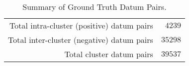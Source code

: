 \begin{table}[htp]
	\begin{center}
	\caption{Summary of Ground Truth Datum Pairs.}
	\label{tab:ch6_table_pair_summary}
		\begin{tabular}{r r}
		\toprule
			Total intra-cluster (positive) datum pairs & $4239$\\
			Total inter-cluster (negative) datum pairs & $35298$\\
			\midrule Total cluster datum pairs & $39537$\\
		\bottomrule
		\end{tabular}
	\end{center}
\end{table}